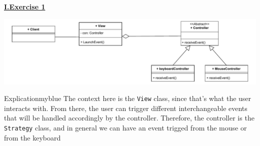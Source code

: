 \begin{center}
    \Huge{\textbf{\underline{I.Exercise 1}}}
\end{center}

\vspace{0.45cm}

\begin{center}
    \includegraphics[height=0.16\textheight]{Exercices/1.EX1/ex1.drawio.pdf}
\end{center}

\vspace{0.25cm}

\begin{prettyBox}{Explication}{myblue}
The context here is the \texttt{View} class, since that's what the user interacts with. 
From there, the user can trigger different interchangeable events that will be 
handled accordingly by the controller. Therefore, the controller is the \texttt{Strategy} class, 
and in general we can have an event trigged from the mouse or from the keyboard
\end{prettyBox}

